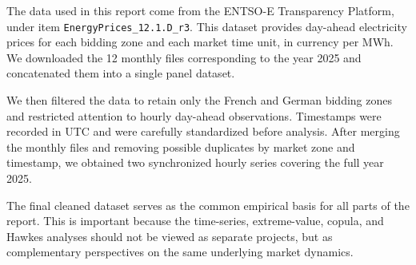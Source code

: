 The data used in this report come from the ENTSO-E Transparency Platform, under item \texttt{EnergyPrices\_12.1.D\_r3}. This dataset provides day-ahead electricity prices for each bidding zone and each market time unit, in currency per MWh. We downloaded the 12 monthly files corresponding to the year 2025 and concatenated them into a single panel dataset.

We then filtered the data to retain only the French and German bidding zones and restricted attention to hourly day-ahead observations. Timestamps were recorded in UTC and were carefully standardized before analysis. After merging the monthly files and removing possible duplicates by market zone and timestamp, we obtained two synchronized hourly series covering the full year 2025.

The final cleaned dataset serves as the common empirical basis for all parts of the report. This is important because the time-series, extreme-value, copula, and Hawkes analyses should not be viewed as separate projects, but as complementary perspectives on the same underlying market dynamics.
